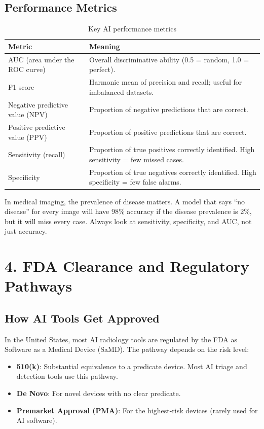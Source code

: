 \subsection*{Performance Metrics}

\begin{table}[h]
\centering
\caption{Key AI performance metrics}
\begin{tabular}{|l|p{8cm}|}
\hline
\textbf{Metric} & \textbf{Meaning} \\
\hline
AUC (area under the ROC curve) & Overall discriminative ability (0.5 = random, 1.0 = perfect). \\
\hline
F1 score & Harmonic mean of precision and recall; useful for imbalanced datasets. \\
\hline
Negative predictive value (NPV) & Proportion of negative predictions that are correct. \\
\hline
Positive predictive value (PPV) & Proportion of positive predictions that are correct. \\
\hline
Sensitivity (recall) & Proportion of true positives correctly identified. High sensitivity = few missed cases. \\
\hline
Specificity & Proportion of true negatives correctly identified. High specificity = few false alarms. \\
\hline
\end{tabular}
\end{table}

\begin{pearlbox}
In medical imaging, the prevalence of disease matters. A model that says ``no disease'' for every image will have 98\% accuracy if the disease prevalence is 2\%, but it will miss every case. Always look at sensitivity, specificity, and AUC, not just accuracy.
\end{pearlbox}


\section*{4. FDA Clearance and Regulatory Pathways}

\subsection*{How AI Tools Get Approved}
In the United States, most AI radiology tools are regulated by the FDA as Software as a Medical Device (SaMD). The pathway depends on the risk level:
\begin{itemize}
    \item \textbf{510(k)}: Substantial equivalence to a predicate device. Most AI triage and detection tools use this pathway.
    \item \textbf{De Novo}: For novel devices with no clear predicate.
    \item \textbf{Premarket Approval (PMA)}: For the highest-risk devices (rarely used for AI software).
\end{itemize}

